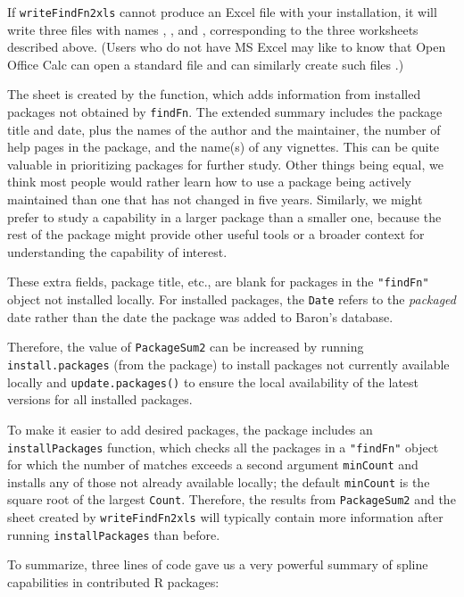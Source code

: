 If {\tt writeFindFn2xls} cannot produce an Excel file with
your installation, it will write three  files with
names , , and
, corresponding to the three
worksheets described above. (Users who do not have MS Excel
may like to know that Open Office Calc can open a standard
 file and can similarly create such files
\citep{CALC09MAN}.)

The  sheet is created by the
 function, which adds information from
installed packages not obtained by
{\tt findFn}.  The extended summary includes the package title and date, plus
the names of the author and the maintainer, the number of help pages
in the package,
and the name(s) of any vignettes.  This can be quite
valuable in prioritizing packages for further study.
Other things being equal, we think most people would
rather learn how to use a package being actively maintained
than one that has not changed in five years.  Similarly,
we might prefer to study a capability in a larger package
than a smaller one, because the rest of the package might
provide other useful tools or a broader context for
understanding the capability of interest.

These extra fields, package title, etc., are blank for
packages in the {\tt "findFn"} object not installed locally.
For installed packages, the {\tt Date} refers to the \emph{packaged} date rather
than the date the package was added to Baron's database.

Therefore, the value of {\tt PackageSum2} can be
increased by running {\tt install.packages} (from the
 package) to install packages not currently
available locally and {\tt update.packages()} to ensure the
local availability of the latest versions for all
installed packages.

To make it easier to add desired packages,
the  package includes
an {\tt installPackages} function, which checks all the
packages in a {\tt "findFn"} object for which
the number of matches exceeds a second argument {\tt minCount}
and installs any of those not already available locally;  the
default {\tt minCount} is the square root of the largest
{\tt Count}.  Therefore, the results from {\tt PackageSum2} and the
 sheet created by {\tt writeFindFn2xls} will typically
contain more information after running {\tt installPackages}
than before.

To summarize, three lines of code gave us a very powerful
summary of spline capabilities in contributed R
packages:

